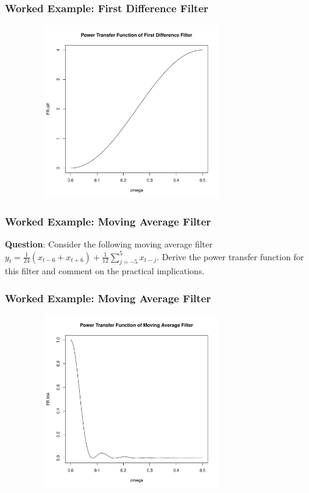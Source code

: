 \documentclass[%
xcolor=pdftex]{beamer}
\begin{document}
\begin{frame}
\frametitle{Worked Example: First Difference Filter}

\includegraphics[width=110mm, height=75mm]{diff.pdf}

\end{frame}

\begin{frame}
\frametitle{Worked Example: Moving Average Filter}

\textbf{Question}: Consider the following moving average filter $y_t = \frac{1}{24} (x_{t-6} + x_{t+6}) + \frac{1}{12}\sum_{j=-5}^5 x_{t-j}$. Derive the power transfer function for this filter and comment on the practical implications.

\vspace{50mm}

\end{frame}

\begin{frame}
\frametitle{Worked Example: Moving Average Filter}

\includegraphics[width=110mm, height=75mm]{ma.pdf}

\end{frame}
\end{document}
